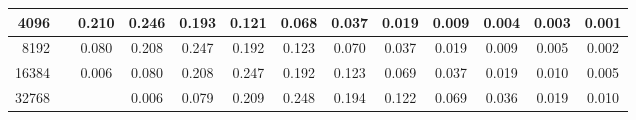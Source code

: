 \begin{appendices}
\begin{table}[H]
{\begin{tabular}{r|cccccccccccc}
4096 &&0.210 &0.246 &0.193 &0.121 &0.068 &0.037 &0.019 &0.009 &0.004 &0.003 &0.001\\\hline

8192 &&0.080 &0.208 &0.247 &0.192 &0.123 &0.070 &0.037 &0.019 &0.009 &0.005 &0.002\\\hline

16384 &&0.006 &0.080 &0.208 &0.247 &0.192 &0.123 &0.069 &0.037 &0.019 &0.010 &0.005\\\hline

32768 &&&0.006 &0.079 &0.209 &0.248 &0.194 &0.122 &0.069 &0.036 &0.019 &0.010\\\hline

\end{tabular}
}

\end{table}
\begin{table}[H]\ContinuedFloat
\caption[]{Experimentally computed CBT Estimate Distributon. Table 3/3}
\end{table}
\end{appendices}
